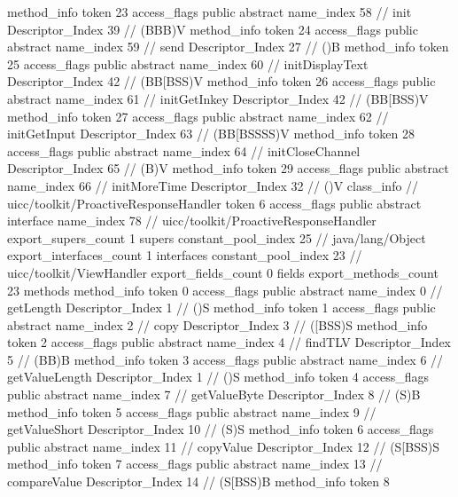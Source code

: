 {{{{{				}
				method_info {
					token	23
					access_flags	public abstract
					name_index	58		// init
					Descriptor_Index	39		// (BBB)V
				}
				method_info {
					token	24
					access_flags	public abstract
					name_index	59		// send
					Descriptor_Index	27		// ()B
				}
				method_info {
					token	25
					access_flags	public abstract
					name_index	60		// initDisplayText
					Descriptor_Index	42		// (BB[BSS)V
				}
				method_info {
					token	26
					access_flags	public abstract
					name_index	61		// initGetInkey
					Descriptor_Index	42		// (BB[BSS)V
				}
				method_info {
					token	27
					access_flags	public abstract
					name_index	62		// initGetInput
					Descriptor_Index	63		// (BB[BSSSS)V
				}
				method_info {
					token	28
					access_flags	public abstract
					name_index	64		// initCloseChannel
					Descriptor_Index	65		// (B)V
				}
				method_info {
					token	29
					access_flags	public abstract
					name_index	66		// initMoreTime
					Descriptor_Index	32		// ()V
				}
			}
		}
		class_info {		// uicc/toolkit/ProactiveResponseHandler
			token	6
			access_flags	public abstract interface
			name_index	78		// uicc/toolkit/ProactiveResponseHandler
			export_supers_count	1
			supers {
				constant_pool_index	25		// java/lang/Object
			}
			export_interfaces_count	1
			interfaces {
				constant_pool_index	23		// uicc/toolkit/ViewHandler
			}
			export_fields_count	0
			fields {
			}
			export_methods_count	23
			methods {
				method_info {
					token	0
					access_flags	public abstract
					name_index	0		// getLength
					Descriptor_Index	1		// ()S
				}
				method_info {
					token	1
					access_flags	public abstract
					name_index	2		// copy
					Descriptor_Index	3		// ([BSS)S
				}
				method_info {
					token	2
					access_flags	public abstract
					name_index	4		// findTLV
					Descriptor_Index	5		// (BB)B
				}
				method_info {
					token	3
					access_flags	public abstract
					name_index	6		// getValueLength
					Descriptor_Index	1		// ()S
				}
				method_info {
					token	4
					access_flags	public abstract
					name_index	7		// getValueByte
					Descriptor_Index	8		// (S)B
				}
				method_info {
					token	5
					access_flags	public abstract
					name_index	9		// getValueShort
					Descriptor_Index	10		// (S)S
				}
				method_info {
					token	6
					access_flags	public abstract
					name_index	11		// copyValue
					Descriptor_Index	12		// (S[BSS)S
				}
				method_info {
					token	7
					access_flags	public abstract
					name_index	13		// compareValue
					Descriptor_Index	14		// (S[BSS)B
				}
				method_info {
					token	8
}}}}}
